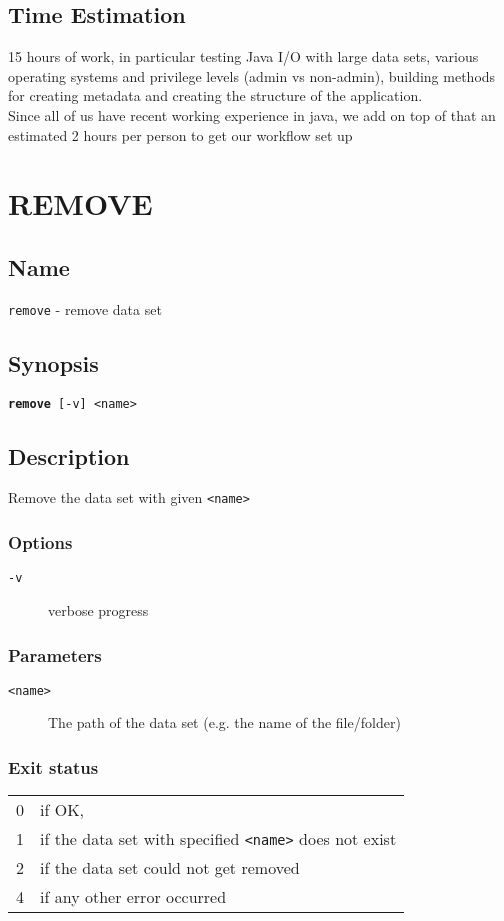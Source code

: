 \documentclass{article} %
\begin{document}
		\subsection*{Time Estimation}
		15 hours of work, in particular testing Java I/O with large data sets, various operating systems and privilege levels (admin vs non-admin), building methods for creating metadata and creating the structure of the application. \\
		\noindent Since all of us have recent working experience in java, we add on top of that an estimated 2 hours per person to get our workflow set up
		
		
		\newpage
		\section*{REMOVE}
		\subsection*{Name}
		\texttt{remove} - remove data set
		\subsection*{Synopsis}
		\texttt{\textbf{remove} [-v] <name>}
		\subsection*{Description}
		Remove the data set with given \texttt{<name>}\\
		
		\noindent
		\subsubsection*{Options}
		\begin{description}
			\item[\texttt{-v}] verbose progress
		\end{description}
		
		\subsubsection*{Parameters}
		\begin{description}
			\item[\texttt{<name>}] The path of the data set (e.g. the name of the file/folder)
		\end{description}
		\subsubsection*{Exit status}
		\begin{tabular}{ll}
			0 &  if OK,\\ 
			1 &  if the data set with specified \texttt{<name>} does not exist\\ 
			2 &  if the data set could not get removed\\
			4 &  if any other error occurred\\
		\end{tabular}
\end{document}
